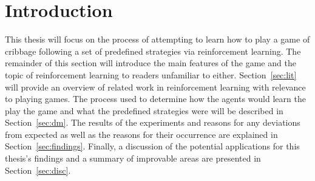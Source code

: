 \section{Introduction}
\label{sec:intro}


This thesis will focus on the process of attempting to learn how to play a game
of cribbage
following a set of predefined strategies
via reinforcement learning.
%
The remainder of this section will introduce the main features
of the game and the topic of reinforcement learning to readers unfamiliar to
either.
%
Section~\ref{sec:lit} will provide an overview of related work in reinforcement
learning with relevance to playing games.
%
The process used to determine how the agents would learn the play the game
and what the predefined strategies were will be described in
Section~\ref{sec:dm}.
%
The results of the experiments and reasons for any deviations from expected
as well as the reasons for their occurrence
are explained in Section~\ref{sec:findings}.
%
Finally,
a discussion of the potential applications for this thesis's findings and
a summary of improvable areas are presented in Section~\ref{sec:disc}.






